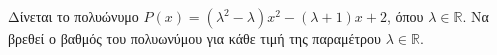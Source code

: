 Δίνεται το πολυώνυμο $ P(x)=(\lambda^2-\lambda)x^2-(\lambda+1)x+2 $, όπου $ \lambda\in\mathbb{R} $. Να βρεθεί ο βαθμός του πολυωνύμου για κάθε τιμή της παραμέτρου $\lambda\in\mathbb{R}$.
